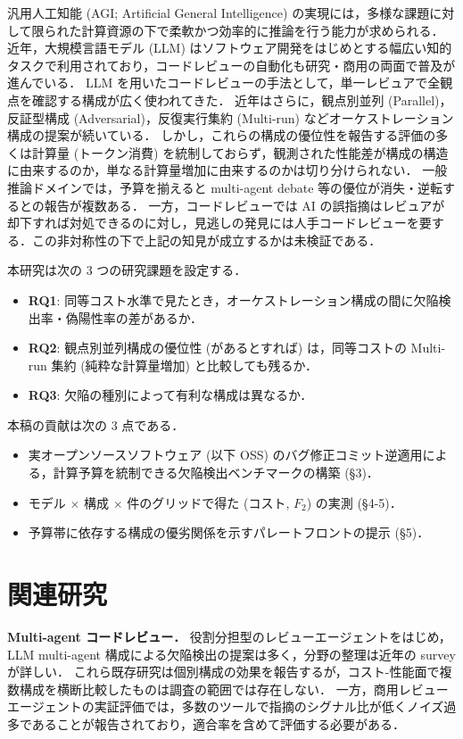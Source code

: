 \documentclass[a4j]{jarticle}
\begin{document}
汎用人工知能 (AGI; Artificial General Intelligence) の実現には，多様な課題に対して限られた計算資源の下で柔軟かつ効率的に推論を行う能力が求められる．
近年，大規模言語モデル (LLM) はソフトウェア開発をはじめとする幅広い知的タスクで利用されており，コードレビューの自動化も研究・商用の両面で普及が進んでいる．
LLM を用いたコードレビューの手法として，単一レビュアで全観点を確認する構成が広く使われてきた．
近年はさらに，観点別並列 (Parallel)，反証型構成 (Adversarial)，反復実行集約 (Multi-run) などオーケストレーション構成の提案が続いている\cite{codeagent}．
しかし，これらの構成の優位性を報告する評価の多くは計算量 (トークン消費) を統制しておらず，観測された性能差が構成の構造に由来するのか，単なる計算量増加に由来するのかは切り分けられない．
一般推論ドメインでは，予算を揃えると multi-agent debate 等の優位が消失・逆転するとの報告が複数ある\cite{mad}．
一方，コードレビューでは AI の誤指摘はレビュアが却下すれば対処できるのに対し，見逃しの発見には人手コードレビューを要する．この非対称性の下で上記の知見が成立するかは未検証である．

本研究は次の 3 つの研究課題を設定する．
\begin{itemize}
\setlength{\itemsep}{2pt}
\item \textbf{RQ1}: 同等コスト水準で見たとき，オーケストレーション構成の間に欠陥検出率・偽陽性率の差があるか．
\item \textbf{RQ2}: 観点別並列構成の優位性 (があるとすれば) は，同等コストの Multi-run 集約 (純粋な計算量増加) と比較しても残るか．
\item \textbf{RQ3}: 欠陥の種別によって有利な構成は異なるか．
\end{itemize}

本稿の貢献は次の 3 点である．
\begin{itemize}
\setlength{\itemsep}{2pt}
\item 実オープンソースソフトウェア (以下 OSS) のバグ修正コミット逆適用による，計算予算を統制できる欠陥検出ベンチマークの構築 (\S 3)．
\item \nModels{} モデル $\times$ \nConfigs{} 構成 $\times$ \nItems{} 件のグリッドで得た (コスト, $F_2$) の実測 (\S 4-5)．
\item 予算帯に依存する構成の優劣関係を示すパレートフロントの提示 (\S 5)．
\end{itemize}

\section{関連研究}

\textbf{Multi-agent コードレビュー．}
役割分担型のレビューエージェント\cite{codeagent}をはじめ，LLM multi-agent 構成による欠陥検出の提案は多く，分野の整理は近年の survey\cite{guo2024largelanguagemodelbased}が詳しい．
これら既存研究は個別構成の効果を報告するが，コスト-性能面で複数構成を横断比較したものは調査の範囲では存在しない．
一方，商用レビューエージェントの実証評価では，多数のツールで指摘のシグナル比が低くノイズ過多であることが報告されており，適合率を含めて評価する必要がある．
\end{document}
